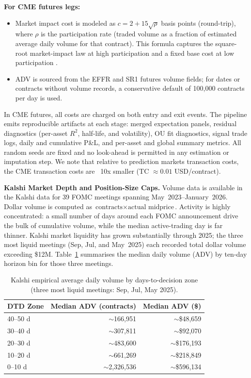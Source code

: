 \textbf{For CME futures legs:}
\begin{itemize}
    \item Market impact cost is modeled as $c = 2 + 15\sqrt{\rho}$ basis points (round-trip), where $\rho$ is the participation rate (traded volume as a fraction of estimated average daily volume for that contract). This formula captures the square-root market-impact law at high participation and a fixed base cost at low participation \cite{almgren2005direct}.
    \item ADV is sourced from the EFFR and SR1 futures volume fields; for dates or contracts without volume records, a conservative default of 100,000 contracts per day is used.
\end{itemize}

In CME futures, all costs are charged on both entry and exit events. The pipeline emits reproducible artifacts at each stage: merged expectation panels, residual diagnostics (per-asset $R^2$, half-life, and volatility), OU fit diagnostics, signal trade logs, daily and cumulative P\&L, and per-asset and global summary metrics. All random seeds are fixed and no look-ahead is permitted in any estimation or imputation step. We note that relative to prediction markets transaction costs, the CME transaction costs are ~10x smaller (TC $\approx 0.01$ USD/contract).

\textbf{Kalshi Market Depth and Position-Size Caps.} Volume data is available
in the Kalshi data for 39 FOMC meetings spanning May~2023--January~2026.
Dollar volume is computed as $\text{contracts} \times \text{actual midprice}$. Activity is highly concentrated: a small number of
days around each FOMC announcement drive the bulk of cumulative volume, while
the median active-trading day is far thinner. Kalshi market liquidity has grown
substantially through 2025; the three most liquid meetings (Sep, Jul, and
May~2025) each recorded total dollar volume exceeding \$12M.
Table~\ref{tab:kalshi-adv} summarises the median daily volume (ADV) by
ten-day horizon bin for those three meetings.

\begin{table}[h]
    \centering
    \caption{Kalshi empirical average daily volume by days-to-decision zone
             (three most liquid meetings: Sep, Jul, May 2025).}
    \label{tab:kalshi-adv}
    \begin{tabular}{lrr}
        \toprule
        \textbf{DTD Zone} &
        \textbf{Median ADV (contracts)} &
        \textbf{Median ADV (\$)} \\
        \midrule
        40--50 d & $\sim$166,951   & $\sim$\$48,659  \\
        30--40 d & $\sim$307,811   & $\sim$\$92,070  \\
        20--30 d & $\sim$483,600   & $\sim$\$176,193 \\
        10--20 d & $\sim$661,269   & $\sim$\$218,849 \\
         0--10 d & $\sim$2,326,536 & $\sim$\$596,134 \\
        \bottomrule
    \end{tabular}
\end{table}



